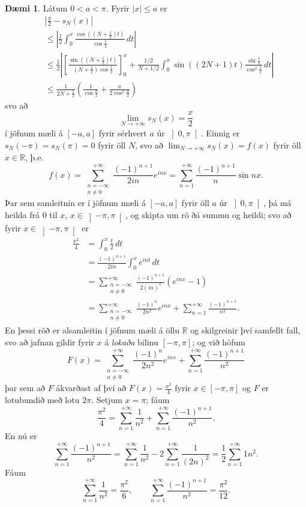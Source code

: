 \documentclass[a4paper,icelandic,11pt]{book}
\theoremstyle{plain}      \newtheorem{setn}{Setning}[chapter]
\theoremstyle{definition} \newtheorem{skilgr}[setn]{Skilgreining}
\newtheorem{daemi}[setn]{Dæmi}
\theoremstyle{remark}     \newtheorem*{ath}{Athugasemd}
\newcommand{\R}{\mathbb R}
\begin{document}
\begin{daemi}
  Látum $0<a<\pi$. Fyrir $|x|\le a$ er
  \begin{align*}
    &\left|\frac x2-s_{N}(x)\right|
    \\
    &\le
    \left|
      \frac12
      \int_{0}^{x}
      \frac{\cos((N+\frac12)t)}{\cos{\frac t2}}
      \,dt
    \right|
    \\
    &\le \frac 12 \left|
      \left[
        \frac{\sin((N+\frac12)t)}{(N+\frac12)\cos\frac t2}
      \right]_{0}^{x}
      + \frac{1/2}{N+1/2}
      \int_{0}^{x}
      \sin((2N+1)t)
      \frac{\sin\frac t2}{\cos^{2}\frac t2}
      \,dt
    \right|
    \\
    &\le \frac{1}{2N+\frac 12}
    \left(
      \frac 1{\cos\frac a2} + \frac a{2\cos^{2}\frac a2}
    \right)
  \end{align*}
  svo að
  \[
  \lim_{N\to+\infty}s_{N}(x)
  = \frac x2
  \]
  í jöfnum mæli á $[-a,a]$ fyrir sérhvert $a$ úr
  $\left]0,\pi\right[$. Einnig er $s_{N}(-\pi)=s_{N}(\pi)=0$ fyrir öll
  $N$, svo að $\lim_{N\to+\infty}s_{N}(x)=f(x)$ fyrir öll $x\in\R$,
  þ.e.
  \[
  f(x)
  = \sum_{\substack{n=-\infty\\n\ne0}}^{+\infty}
  \frac{(-1)^{n+1}}{2in}e^{inx}
  = \sum_{n=1}^{+\infty}\frac{(-1)^{n+1}}n \sin{nx}.
  \]
  Þar sem samleitnin er í jöfnum mæli á $[-a,a]$ fyrir öll $a$ úr
  $\left]0,\pi\right[$, þá má heilda frá $0$ til $x$,
  $x\in\left]-\pi,\pi\right[$, og skipta um rö ðá summu og heildi; svo
  að fyrir $x\in\left]-\pi,\pi\right[$ er
  \begin{align*}
    \frac{x^{2}}4
    &= \int_{0}^{x}\frac t2\,dt
    \\
    &= 
    \frac{(-1)^{n+1}}{2in}
    \int_{0}^{x}e^{int}\,dt
    \\
    &= \sum_{\substack{n=-\infty\\n\ne 0}}^{+\infty}
    \frac{(-1)^{n+1}}{2(in)^{2}}(e^{inx}-1)
    \\
    &= \sum_{\substack{n=-\infty\\n\ne 0}}^{+\infty}
    \frac{(-1)^{n}}{2n^{2}}e^{inx}
    + \sum_{n=1}^{+\infty}\frac{(-1)^{n+1}}{n^{2}}.
  \end{align*}
  En þessi röð er alsamleitin í jöfnum mæli á öllu $\R$ og skilgreinir
  því samfellt fall, svo að jafnan gildir fyrir $x$ á \emph{lokaða}
  bilinu $[-\pi,\pi]$; og við höfum
  \[
  F(x)
  = \sum_{\substack{n=-\infty\\n\ne 0}}^{+\infty}
  \frac{(-1)^{n}}{2n^{2}}e^{inx}
  + \sum_{n=1}^{+\infty}\frac{(-1)^{n+1}}{n^{2}}
  \]
  þar sem að $F$ ákvarðast af því að $F(x)=\frac{x^{2}}4$ fyrir
  $x\in[-\pi,\pi]$ og $F$ er lotubundið með lotu $2\pi$. Setjum
  $x=\pi$; fáum
  \[
  \frac{\pi^{2}}4
  = \sum_{n=1}^{+\infty}\frac{1}{n^{2}}
  + \sum_{n=1}^{+\infty}\frac{(-1)^{n+1}}{n^{2}}.
  \]
  En nú er
  \[
  \sum_{n=1}^{+\infty}\frac{(-1)^{n+1}}{n^{2}}
  = \sum_{n=1}^{+\infty}\frac{1}{n^{2}}
  - 2\sum_{n=1}^{+\infty}\frac{1}{(2n)^{2}}
  = \frac 12 \sum_{n=1}^{+\infty}{1}{n^{2}}.
  \]
  Fáum
  \[
  \sum_{n=1}^{+\infty}\frac{1}{n^{2}}
  = \frac{\pi^{2}}{6},
  \qquad
  \sum_{n=1}^{+\infty}\frac{(-1)^{n+1}}{n^{2}}
  = \frac{\pi^{2}}{12}.
  \]


\end{daemi}
\end{document}
